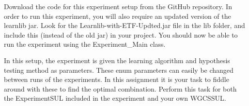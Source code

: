 \documentclass[a4paper]{article}
\begin{document}
Download the code for this experiment setup from the GitHub repository. In order to run this experiment, you will also require an updated version of the learnlib jar. Look for the Learnlib-with-ETF-Updted.jar file in the lib folder, and include this (instead of the old jar) in your project. You should now be able to run the experiment using the Experiment\_Main class.

In this setup, the experiment is given the learning algorithm and hypothesis testing method as parameters. These enum parameters can easily be changed between runs of the experiments. In this assignment it is your task to fiddle around with these to find the optimal combination. Perform this task for both the ExperimentSUL included in the experiment and your own WGCSSUL. 
\end{document}
